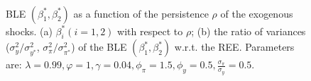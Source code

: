 \begin{figure}
    \begin{center}
        \mbox{\quad
        }
   \end{center}
   \caption{ \label{blerhotrc}
   BLE $(\beta^*_1, \beta^*_2)$ as a function of the persistence $\rho$ of the exogenous shocks. (a) $\beta^*_i (i=1,2)$ with respect to $\rho$; (b) the ratio of variances ($\sigma_y^2/\sigma_{y^*}^2$, $\sigma_\pi^2/\sigma_{\pi^*}^2$) of the BLE $(\beta^*_1, \beta^*_2)$ w.r.t. the REE. Parameters are: $\lambda=0.99, \varphi=1, \gamma=0.04, \phi_\pi=1.5,\phi_y=0.5, \frac{\sigma_{\pi}}{\sigma_y}=0.5$. }
\end{figure}



